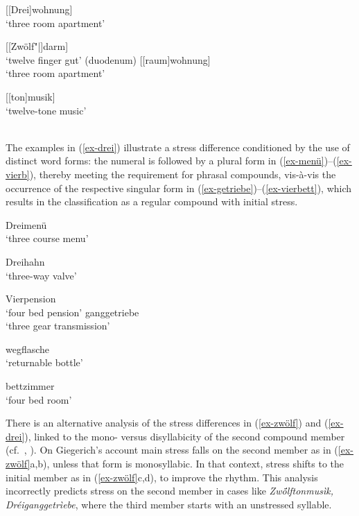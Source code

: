 \documentclass[output=paper
 ,nobabel
 ,draftmode
 ,colorlinks, citecolor=brown
]{langscibook}
\begin{document}
\begin{multicols}{2}
\eal\label{ex-zwölf}
\ex\label{ex-dreizimmerwohnung}
{}[[Drei]wohnung]\\
`three room apartment'

\ex\label{ex-finger}
{} [[Zwölf"|]darm]\\
`twelve finger gut' (duodenum)
%
\columnbreak
%
\ex\label{ex-dreiraumwohnung}
{} [[raum]wohnung]\\
`three room apartment'

\ex\label{ex-zwölfton}
{} [[ton]musik]\\
`twelve-tone music'\\
~
\zl
\end{multicols}

\noindent
The examples in (\ref{ex-drei}) illustrate a stress difference conditioned by the use of distinct word forms: the numeral is followed by a plural form in (\ref{ex-menü})–(\ref{ex-vierb}), thereby meeting the requirement for phrasal compounds, vis-à-vis the occurrence of the respective singular form in (\ref{ex-getriebe})–(\ref{ex-vierbett}), which results in the classification as a regular compound with initial stress.

\begin{multicols}{2}
\eal\label{ex-drei}
\ex\label{ex-menü}
Dreimenü\\
`three course menu'

\ex\label{ex-dreiw}
Dreihahn\\
`three-way valve'

\ex\label{ex-vierb}
Vierpension\\
`four bed pension'
%
\columnbreak
%
\ex\label{ex-getriebe}
ganggetriebe\\
`three gear transmission'

\ex\label{ex-mehrweg}
wegflasche\\
`returnable bottle'

\ex\label{ex-vierbett}
bettzimmer \\
`four bed room'
\zl
\end{multicols}

\noindent
There is an alternative analysis of the stress differences in (\ref{ex-zwölf}) and (\ref{ex-drei}),
linked to the mono- versus disyllabicity of the second compound member (cf.\
\citealp[154]{Giegerich1985}, \citealp[301]{Wiese2000}). On Giegerich's account main stress falls on
the second member as in (\ref{ex-zwölf}a,b), unless that form is
monosyllabic. In that context, stress shifts to the initial member as in (\ref{ex-zwölf}c,d), to improve the rhythm. This analysis incorrectly predicts stress on the second member in cases like \emph{Zw\'{ö}lftonmusìk, Dréiganggetrìebe}, where the third member starts with an unstressed syllable.
\end{document}
